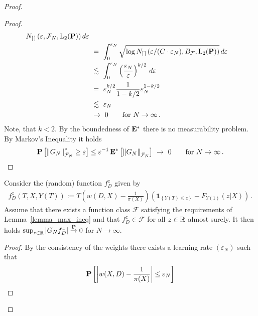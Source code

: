 \begin{proof}
\begin{proof}
\begin{align*}
{      N_{[\,]}
\left( \varepsilon, \mathcal{F}_N,\mathrm{L}_2(\P) \right)
    }
    \,
    d\varepsilon
    \\
    &
    \ 
    =
    \ 
      \int_0^{\varepsilon_N}
      \sqrt{\log 
      N_{[\,]}
\left( \varepsilon/(C\cdot \varepsilon_N), B_\mathcal{F},\mathrm{L}_2(\P) \right)
    }
    \,
    d\varepsilon
    \\
    &
    \ 
    \lesssim
    \ 
      \int_0^{\varepsilon_N}
      \left( 
      \frac{\varepsilon_N}{\varepsilon}
    \right)^{k/2}
    \,
    d\varepsilon
    \\
    &
    \ 
    =
    \ 
  \varepsilon_N^{k/2}
  \frac{1}{1-k/2}
  \varepsilon_N^{1-k/2}
  \\
    &
    \ 
  \lesssim
    \ 
  \varepsilon_N
  \\
    &
    \ 
  \to
  \ 
  0
  \qquad
  \text{for}\ 
  N\to
  \infty
  \,.
  \end{align*}
  Note, that $k<2$.
  By the boundedness of $\mathbf{E}^*$ there is no measurability problem.
  By Markov's Inequality it holds
  \begin{align*}
    \P
    \left[ 
      \norm{G_N}^*_{\mathcal{F}_N}\ge \varepsilon
    \right]
    \le
    \varepsilon^{-1}
    \,
    \E^*
    \left[ 
      \norm{G_N}_{\mathcal{F}_N}
    \right]
    \ 
    \to
    \ 
    0
    \qquad
    \text{for}\ 
    N\to\infty
    \,.
  \end{align*}
\end{proof}
\begin{lemma}
  Consider 
  the (random) function
  $
  f_D^z
  $ given by
  \begin{gather}
    f_{D}^z(T,X,Y(T))
    :=
    T
    \left( 
    w(D,X)- \frac{1}{\pi(X)}
    \right)
    \left( 
    \mathbf{1}_{\left\{ Y(T) \le z \right\}}
    -
  F_{Y(1)}(z|X)
    \right)
    \,.
  \end{gather}
  Assume that 
  there exists a function class $\mathcal{F}$ satisfying the requirements of Lemma~\ref{lemma_max_ineq} and that
  $
  f_D^z
  \in \mathcal{F}
  $
  for all $z\in\mathbb{R}$ almost surely.
  It then holds
  $
  \sup_{z\in\mathbb{R}} \left| G_Nf_D^z \right|
  \overset{\mathbf{P}}{\to}0$ for 
  $N\to\infty$.
\end{lemma}
\begin{proof}
  By the consistency of the weights there exists a learning rate $(\varepsilon_N)$ such that
  \begin{gather}
    \P
    \left[ 
      \left| 
      w(X,D)
      -
      \frac{1}{\pi(X)}
      \right|
      \le
      \varepsilon_N
    \right]

\end{gather}
\end{proof}
\end{proof}
